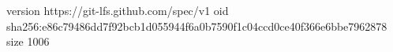 version https://git-lfs.github.com/spec/v1
oid sha256:e86c79486dd7f92bcb1d055944f6a0b7590f1c04ccd0ce40f366e6bbe7962878
size 1006
